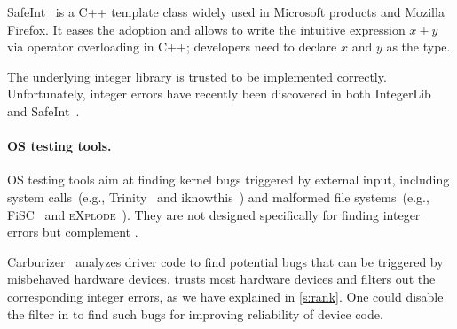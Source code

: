 SafeInt~\cite{safeint} is a C++ template class widely used in Microsoft
products and Mozilla Firefox.  It eases the adoption and allows to write
the intuitive expression $x + y$ via operator overloading in C++;
developers need to declare $x$ and $y$ as the 
type.

The underlying integer library is trusted to be implemented correctly.
Unfortunately, integer errors have recently been discovered in both
IntegerLib and SafeInt~\cite{ioc}.
%
%
%


\paragraph{OS testing tools.}
OS testing tools aim at finding kernel bugs triggered by external input,
including system calls~(e.g., Trinity~\cite{trinity} and
iknowthis~\cite{iknowthis}) and malformed file systems~(e.g.,
FiSC~\cite{fisc:yang} and \textsc{eXplode}~\cite{explode:yang}).
They are not designed specifically for finding integer errors
but complement \sys.


Carburizer~\cite{kadav:tolerating} analyzes driver code to find
potential bugs that can be triggered by misbehaved hardware devices.
\sys trusts most hardware devices and filters out the corresponding
integer errors, as we have explained in \autoref{s:rank}.  One could
disable the filter in \sys to find such bugs for improving reliability
of device code.


